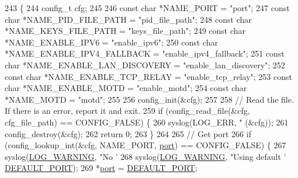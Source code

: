 \begin{DoxyCode}
243 \{
244     config\_t cfg;
245 
246     \textcolor{keyword}{const} \textcolor{keywordtype}{char} *NAME\_PORT                 = \textcolor{stringliteral}{"port"};
247     \textcolor{keyword}{const} \textcolor{keywordtype}{char} *NAME\_PID\_FILE\_PATH        = \textcolor{stringliteral}{"pid\_file\_path"};
248     \textcolor{keyword}{const} \textcolor{keywordtype}{char} *NAME\_KEYS\_FILE\_PATH       = \textcolor{stringliteral}{"keys\_file\_path"};
249     \textcolor{keyword}{const} \textcolor{keywordtype}{char} *NAME\_ENABLE\_IPV6          = \textcolor{stringliteral}{"enable\_ipv6"};
250     \textcolor{keyword}{const} \textcolor{keywordtype}{char} *NAME\_ENABLE\_IPV4\_FALLBACK = \textcolor{stringliteral}{"enable\_ipv4\_fallback"};
251     \textcolor{keyword}{const} \textcolor{keywordtype}{char} *NAME\_ENABLE\_LAN\_DISCOVERY = \textcolor{stringliteral}{"enable\_lan\_discovery"};
252     \textcolor{keyword}{const} \textcolor{keywordtype}{char} *NAME\_ENABLE\_TCP\_RELAY     = \textcolor{stringliteral}{"enable\_tcp\_relay"};
253     \textcolor{keyword}{const} \textcolor{keywordtype}{char} *NAME\_ENABLE\_MOTD          = \textcolor{stringliteral}{"enable\_motd"};
254     \textcolor{keyword}{const} \textcolor{keywordtype}{char} *NAME\_MOTD                 = \textcolor{stringliteral}{"motd"};
255 
256     config\_init(&cfg);
257 
258     \textcolor{comment}{// Read the file. If there is an error, report it and exit.}
259     \textcolor{keywordflow}{if} (config\_read\_file(&cfg, cfg\_file\_path) == CONFIG\_FALSE) \{
260         syslog(LOG\_ERR, \textcolor{stringliteral}{"%
      (&cfg));
261         config\_destroy(&cfg);
262         \textcolor{keywordflow}{return} 0;
263     \}
264 
265     \textcolor{comment}{// Get port}
266     \textcolor{keywordflow}{if} (config\_lookup\_int(&cfg, NAME\_PORT, \hyperlink{irc__syncbot_8c_a8e0798404bf2cf5dabb84c5ba9a4f236}{port}) == CONFIG\_FALSE) \{
267         syslog(\hyperlink{logger_8h_aa5a9053636a30269210c54e734e0d583a8f6fe15bfe15104da6d1b360194a5400}{LOG\_WARNING}, \textcolor{stringliteral}{"No '%
268         syslog(\hyperlink{logger_8h_aa5a9053636a30269210c54e734e0d583a8f6fe15bfe15104da6d1b360194a5400}{LOG\_WARNING}, \textcolor{stringliteral}{"Using default '%
      \hyperlink{tox-bootstrapd_8c_a16b710f592bf8f7900666392adc444dc}{DEFAULT\_PORT});
269         *\hyperlink{irc__syncbot_8c_a8e0798404bf2cf5dabb84c5ba9a4f236}{port} = \hyperlink{tox-bootstrapd_8c_a16b710f592bf8f7900666392adc444dc}{DEFAULT\_PORT};
}}}
\end{DoxyCode}

